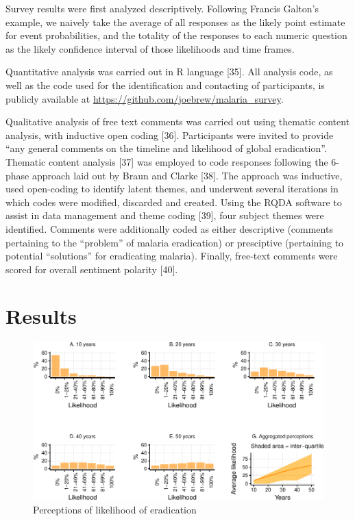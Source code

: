\documentclass[]{article}
\begin{document}
Survey results were first analyzed descriptively. Following Francis
Galton's example, we naively take the average of all responses as the
likely point estimate for event probabilities, and the totality of the
responses to each numeric question as the likely confidence interval of
those likelihoods and time frames.

Quantitative analysis was carried out in R language {[}35{]}. All
analysis code, as well as the code used for the identification and
contacting of participants, is publicly available at
\url{https://github.com/joebrew/malaria_survey}.

Qualitative analysis of free text comments was carried out using
thematic content analysis, with inductive open coding {[}36{]}.
Participants were invited to provide ``any general comments on the
timeline and likelihood of global eradication''. Thematic content
analysis {[}37{]} was employed to code responses following the 6-phase
approach laid out by Braun and Clarke {[}38{]}. The approach was
inductive, used open-coding to identify latent themes, and underwent
several iterations in which codes were modified, discarded and created.
Using the RQDA software to assist in data management and theme coding
{[}39{]}, four subject themes were identified. Comments were
additionally coded as either descriptive (comments pertaining to the
``problem'' of malaria eradication) or presciptive (pertaining to
potential ``solutions'' for eradicating malaria). Finally, free-text
comments were scored for overall sentiment polarity {[}40{]}.

\section{Results}\label{results}

\begin{figure}[h]

{\centering \includegraphics{paper_files/figure-latex/unnamed-chunk-5-1} 

}

\caption{Perceptions of likelihood of eradication}\label{fig:unnamed-chunk-5}
\end{figure}
\end{document}
